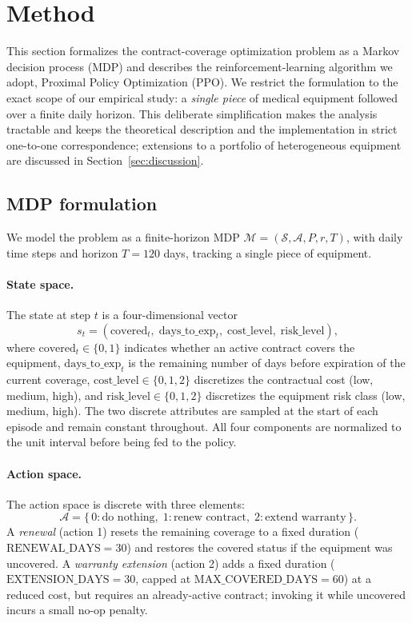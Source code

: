 \section{Method}
\label{sec:methodology}

This section formalizes the contract-coverage optimization problem as a
Markov decision process (MDP) and describes the reinforcement-learning
algorithm we adopt, Proximal Policy Optimization (PPO). We restrict the
formulation to the exact scope of our empirical study: a \emph{single
piece} of medical equipment followed over a finite daily horizon. This
deliberate simplification makes the analysis tractable and keeps the
theoretical description and the implementation in strict one-to-one
correspondence; extensions to a portfolio of heterogeneous equipment are
discussed in Section~\ref{sec:discussion}.


\subsection{MDP formulation}
\label{subsec:mdp}

We model the problem as a finite-horizon MDP
$\mathcal{M} = (\mathcal{S}, \mathcal{A}, P, r, T)$, with daily time steps
and horizon $T = 120$ days, tracking a single piece of equipment.


\paragraph{State space.}
The state at step $t$ is a four-dimensional vector
\[
    s_t = (\mathrm{covered}_t,\;
           \mathrm{days\_to\_exp}_t,\;
           \mathrm{cost\_level},\;
           \mathrm{risk\_level}),
\]
where $\mathrm{covered}_t \in \{0, 1\}$ indicates whether an active
contract covers the equipment, $\mathrm{days\_to\_exp}_t$ is the remaining
number of days before expiration of the current coverage,
$\mathrm{cost\_level} \in \{0, 1, 2\}$ discretizes the contractual cost
(low, medium, high), and $\mathrm{risk\_level} \in \{0, 1, 2\}$
discretizes the equipment risk class (low, medium, high). The two
discrete attributes are sampled at the start of each episode and remain
constant throughout. All four components are normalized to the unit
interval before being fed to the policy.


\paragraph{Action space.}
The action space is discrete with three elements:
\[
    \mathcal{A} = \{\, 0: \text{do nothing},\;
                      1: \text{renew contract},\;
                      2: \text{extend warranty} \,\}.
\]
A \emph{renewal} (action 1) resets the remaining coverage to a fixed
duration ($\mathrm{RENEWAL\_DAYS} = 30$) and restores the covered status
if the equipment was uncovered. A \emph{warranty extension} (action 2)
adds a fixed duration ($\mathrm{EXTENSION\_DAYS} = 30$, capped at
$\mathrm{MAX\_COVERED\_DAYS} = 60$) at a reduced cost, but requires an
already-active contract; invoking it while uncovered incurs a small
no-op penalty.


